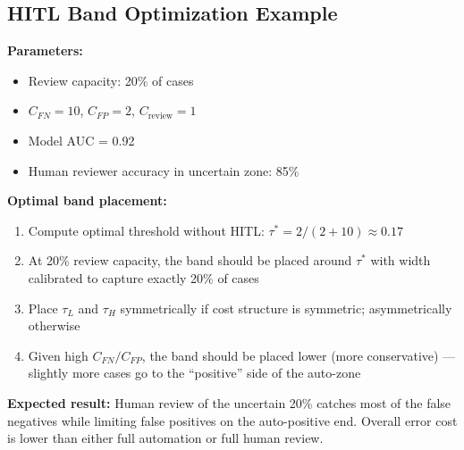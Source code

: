 \subsection{HITL Band Optimization Example}

\textbf{Parameters:}
\begin{itemize}
    \item Review capacity: 20\% of cases
    \item $C_{FN} = 10$, $C_{FP} = 2$, $C_{\text{review}} = 1$
    \item Model AUC = 0.92
    \item Human reviewer accuracy in uncertain zone: 85\%
\end{itemize}

\textbf{Optimal band placement:}
\begin{enumerate}
    \item Compute optimal threshold without HITL: $\tau^* = 2/(2+10) \approx 0.17$
    \item At 20\% review capacity, the band should be placed around $\tau^*$ with width calibrated to capture exactly 20\% of cases
    \item Place $\tau_L$ and $\tau_H$ symmetrically if cost structure is symmetric; asymmetrically otherwise
    \item Given high $C_{FN}/C_{FP}$, the band should be placed lower (more conservative) --- slightly more cases go to the ``positive'' side of the auto-zone
\end{enumerate}

\textbf{Expected result:} Human review of the uncertain 20\% catches most of the false negatives while limiting false positives on the auto-positive end. Overall error cost is lower than either full automation or full human review.
